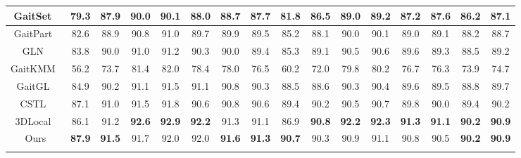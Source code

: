 \documentclass[runningheads]{llncs}
\begin{document}
\begin{table}[htbp]
{\begin{tabular}{cc|c|c|c|c|c|c|c|c|c|c|c|c|c|c}
    \multicolumn{1}{c|}{GaitSet~\cite{aaai2019gaitset}} & 79.3  & 87.9  & 90.0  & 90.1  & 88.0  & 88.7  & 87.7  & 81.8  & 86.5  & 89.0  & 89.2  & 87.2  & 87.6  & 86.2  & 87.1   \\
    \hline
    \multicolumn{1}{c|}{GaitPart~\cite{gaitpart}} & 82.6  & 88.9  & 90.8  & 91.0  & 89.7  & 89.9  & 89.5  & 85.2  & 88.1  & 90.0  & 90.1  & 89.0  & 89.1  & 88.2  & 88.7   \\
    \hline
    \multicolumn{1}{c|}{GLN~\cite{gln}}   & 83.8  & 90.0  & 91.0  & 91.2  & 90.3  & 90.0  & 89.4  & 85.3  & 89.1  & 90.5 & 90.6 & 89.6  & 89.3  & 88.5  & 89.2   \\
    \hline
    \multicolumn{1}{c|}{GaitKMM~\cite{Zhang_2021_CVPR}}   & 56.2  & 73.7  & 81.4  & 82.0  & 78.4  & 78.0  & 76.5  & 60.2  & 72.0  & 79.8  & 80.2  & 76.7  & 76.3  & 73.9  & 74.7  \\
    \hline
    \multicolumn{1}{c|}{GaitGL~\cite{gaitgl}} & 84.9  & 90.2  & 91.1  & 91.5  & 91.1  & 90.8  & 90.3  & 88.5  & 88.6  & 90.3  & 90.4  & 89.6  & 89.5  & 88.8  & 89.7  \\
    \hline
    \multicolumn{1}{c|}{CSTL~\cite{cstl}} & 87.1  & 91.0  & 91.5  & 91.8  & 90.6  & 90.8  & 90.6  & 89.4  & 90.2  & 90.5  & 90.7  & 89.8  & 90.0  & 89.4  & 90.2  \\    
    \hline
     \multicolumn{1}{c|}{3DLocal~\cite{3dlocal}}  & 86.1 & 91.2 & \textbf{92.6} & \textbf{92.9} & \textbf{92.2} & 91.3 & 91.1 & 86.9 & \textbf{90.8} & \textbf{92.2} & \textbf{92.3} & \textbf{91.3} & \textbf{91.1} & \textbf{90.2} & \textbf{90.9} \\
    \hline
     \multicolumn{1}{c|}{Ours}  & \textbf{87.9} & \textbf{91.5} & 91.7 & 92.0 & 92.0 & \textbf{91.6} & \textbf{91.3} & \textbf{90.7} & 90.3 & 90.9 & 91.1 & 90.8 & 90.5 & \textbf{90.2} & \textbf{90.9} \\
     
    \hline
    \\


\end{tabular}}
\end{table}
\end{document}
